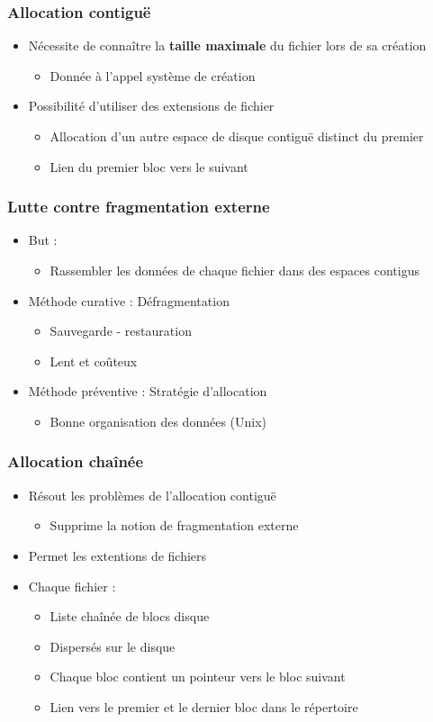 \begin{frame}
\frametitle{Allocation contiguë}
\begin{itemize}
\item Nécessite de connaître la \textbf{taille maximale} du fichier lors de sa création
\begin{itemize}
\item Donnée à l'appel système de création
\end{itemize}
\item Possibilité d'utiliser des extensions de fichier
\begin{itemize}
\item Allocation d'un autre espace de disque contiguë distinct du premier
\item Lien du premier bloc vers le suivant
\end{itemize}
\end{itemize}
\end{frame}

\begin{frame}
\frametitle{Lutte contre fragmentation externe}
\begin{itemize}
\item But :
\begin{itemize}
\item Rassembler les données de chaque fichier dans des espaces contigus
\end{itemize}
\item Méthode curative : Défragmentation
\begin{itemize}
\item Sauvegarde - restauration
\item Lent et coûteux
\end{itemize}
\item Méthode préventive : Stratégie d’allocation
\begin{itemize}
\item Bonne organisation des données (Unix)
\end{itemize}
\end{itemize}
\end{frame}

\begin{frame}
\frametitle{Allocation chaînée}
\begin{itemize}
\item Résout les problèmes de l'allocation contiguë
\begin{itemize}
\item Supprime la notion de fragmentation externe
\end{itemize}
\item Permet les extentions de fichiers
\item Chaque fichier :
\begin{itemize}
\item Liste chaînée de blocs disque
\item Dispersés sur le disque
\item Chaque bloc contient un pointeur vers le bloc suivant
\item Lien vers le premier et le dernier bloc dans le répertoire
\end{itemize}
\end{itemize}
\end{frame}

